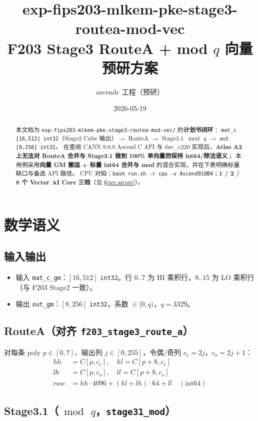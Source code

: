 \documentclass[UTF8,a4paper,11pt]{ctexart}
\title{exp-fips203-mlkem-pke-stage3-routea-mod-vec\\F203 Stage3 RouteA + mod $q$ 向量预研方案}
\author{ascendc 工程（预研）}
\date{2026-05-19}
\begin{document}
\maketitle

\begin{abstract}
本文档为 \texttt{exp-fips203-mlkem-pke-stage3-routea-mod-vec/} 的\textbf{计划书闭环}：
\texttt{mat\_c [16,512] int32}（Stage2 Cube 输出）$\rightarrow$ RouteA $\rightarrow$ Stage3.1 $\bmod\,q$ $\rightarrow$ \texttt{out [8,256] int32}。
在查阅 CANN 9.0.0 Ascend C API 与 dav\_c220 实现后，\textbf{Atlas A2 上无法对 RouteA 合并与 Stage3.1 做到 100\% 单向量而保持 int64/除法语义}；
本用例采用\textbf{向量 GM 搬运 + 标量 int64 合并与 mod} 的混合实现，并在下表明确标量缺口与备选 API 路径。
CPU 对拍：\texttt{bash run.sh -r cpu -v Ascend910B4}；\textbf{1 / 2 / 8 个 Vector AI Core 三档}（见 §\ref{sec:aicore}）。
\end{abstract}

\tableofcontents
\newpage

\section{数学语义}

\subsection{输入输出}
\begin{itemize}
  \item 输入 \texttt{mat\_c\_gm}：$[16,512]$ \texttt{int32}。行 $0..7$ 为 HI 乘积行，$8..15$ 为 LO 乘积行（与 F203 Stage2 一致）。
  \item 输出 \texttt{out\_gm}：$[8,256]$ \texttt{int32}，系数 $\in [0,q)$，$q=3329$。
\end{itemize}

\subsection{RouteA（对齐 \texttt{f203\_stage3\_route\_a}）}
对每条 poly $p\in[0,7]$、输出列 $j\in[0,255]$，令偶/奇列 $c_e=2j$，$c_o=2j+1$：
\begin{align}
  hh &= C[p, c_e], \quad hl = C[p+8, c_e] \\
  lh &= C[p, c_o], \quad ll = C[p+8, c_o] \\
  raw &= hh\cdot 4096 + (hl+lh)\cdot 64 + ll \quad (\text{int64})
\end{align}

\subsection{Stage3.1（$\bmod\,q$，\texttt{stage31\_mod}）}
\end{document}
